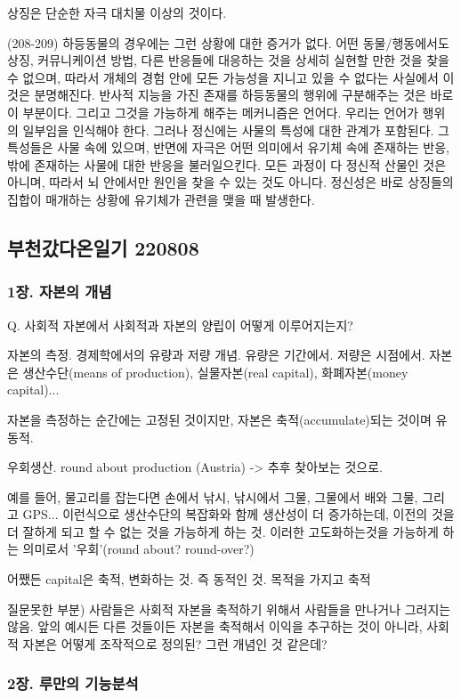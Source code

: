 \documentclass[11pt, a4paper]{article}
\begin{document}
상징은 단순한 자극 대치물 이상의 것이다.

(208-209) 하등동물의 경우에는 그런 상황에 대한 증거가 없다. 어떤 동물/행동에서도 상징, 커뮤니케이션 방법, 다른 반응들에 대응하는 것을 상세히 실현할 만한 것을 찾을 수 없으며, 따라서 개체의 경험 안에 모든 가능성을 지니고 있을 수 없다는 사실에서 이것은 분명해진다. 반사적 지능을 가진 존재를 하등동물의 행위에 구분해주는 것은 바로 이 부분이다. 그리고 그것을 가능하게 해주는 메커니즘은 언어다. 우리는 언어가 행위의 일부임을 인식해야 한다. 그러나 정신에는 사물의 특성에 대한 관계가 포함된다. 그 특성들은 사물 속에 있으며, 반면에 자극은 어떤 의미에서 유기체 속에 존재하는 반응, 밖에 존재하는 사물에 대한 반응을 불러일으킨다. 모든 과정이 다 정신적 산물인 것은 아니며, 따라서 뇌 안에서만 원인을 찾을 수 있는 것도 아니다. 정신성은 바로 상징들의 집합이 매개하는 상황에 유기체가 관련을 맺을 때 발생한다.


\newpage
\subsection{부천갔다온일기 220808}
\subsubsection{1장. 자본의 개념}
Q. 사회적 자본에서 사회적과 자본의 양립이 어떻게 이루어지는지?

자본의 측정.
경제학에서의 유량과 저량 개념. 유량은 기간에서. 저량은 시점에서.
자본은 생산수단(means of production), 실물자본(real capital), 화폐자본(money capital)...

자본을 측정하는 순간에는 고정된 것이지만, 자본은 축적(accumulate)되는 것이며 유동적.

우회생산. round about production (Austria)
-> 추후 찾아보는 것으로.

예를 들어, 물고리를 잡는다면 손에서 낚시, 낚시에서 그물, 그물에서 배와 그물, 그리고 GPS... 이런식으로 생산수단의 복잡화와 함께 생산성이 더 증가하는데, 이전의 것을 더 잘하게 되고 할 수 없는 것을 가능하게 하는 것. 이러한 고도화하는것을 가능하게 하는 의미로서 '우회'(round about? round-over?)

어쨌든 capital은 축적, 변화하는 것. 즉 동적인 것. 목적을 가지고 축적

질문못한 부분) 사람들은 사회적 자본을 축적하기 위해서 사람들을 만나거나 그러지는 않음. 앞의 예시든 다른 것들이든 자본을 축적해서 이익을 추구하는 것이 아니라, 사회적 자본은 어떻게 조작적으로 정의된? 그런 개념인 것 같은데?

\subsubsection{2장. 루만의 기능분석}
\end{document}
